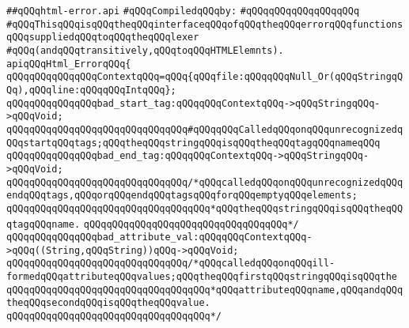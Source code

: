 \label{src/lib/html/html-error.api}
\verb|##qQQqhtml-error.api|\newline
\newline
\verb|#qQQqCompiledqQQqby:|\newline
\verb|#qQQqqQQqqQQqqQQqqQQq|\newline
\newline
\newline
\newline
\verb|#qQQqThisqQQqisqQQqtheqQQqinterfaceqQQqofqQQqtheqQQqerrorqQQqfunctionsqQQqsuppliedqQQqtoqQQqtheqQQqlexer|\newline
\verb|#qQQq(andqQQqtransitively,qQQqtoqQQqHTMLElemnts).|\newline
\newline
\verb|apiqQQqHtml_ErrorqQQq{|\newline
\newline
\verb|qQQqqQQqqQQqqQQqContextqQQq=qQQq{qQQqfile:qQQqqQQqNull_Or(qQQqStringqQQq),qQQqline:qQQqqQQqIntqQQq};|\newline
\newline
\verb|qQQqqQQqqQQqqQQqbad_start_tag:qQQqqQQqContextqQQq->qQQqStringqQQq->qQQqVoid;|\newline
\verb|qQQqqQQqqQQqqQQqqQQqqQQqqQQqqQQq#qQQqqQQqCalledqQQqonqQQqunrecognizedqQQqstartqQQqtags;qQQqtheqQQqstringqQQqisqQQqtheqQQqtagqQQqnameqQQq|\newline
\verb|qQQqqQQqqQQqqQQqbad_end_tag:qQQqqQQqContextqQQq->qQQqStringqQQq->qQQqVoid;|\newline
\verb|qQQqqQQqqQQqqQQqqQQqqQQqqQQqqQQq/*qQQqcalledqQQqonqQQqunrecognizedqQQqendqQQqtags,qQQqorqQQqendqQQqtagsqQQqforqQQqemptyqQQqelements;|\newline
\verb|qQQqqQQqqQQqqQQqqQQqqQQqqQQqqQQqqQQq*qQQqtheqQQqstringqQQqisqQQqtheqQQqtagqQQqname.|\newline
\verb|qQQqqQQqqQQqqQQqqQQqqQQqqQQqqQQqqQQq*/|\newline
\verb|qQQqqQQqqQQqqQQqbad_attribute_val:qQQqqQQqContextqQQq->qQQq((String,qQQqString))qQQq->qQQqVoid;|\newline
\verb|qQQqqQQqqQQqqQQqqQQqqQQqqQQqqQQq/*qQQqcalledqQQqonqQQqill-formedqQQqattributeqQQqvalues;qQQqtheqQQqfirstqQQqstringqQQqisqQQqthe|\newline
\verb|qQQqqQQqqQQqqQQqqQQqqQQqqQQqqQQqqQQq*qQQqattributeqQQqname,qQQqandqQQqtheqQQqsecondqQQqisqQQqtheqQQqvalue.|\newline
\verb|qQQqqQQqqQQqqQQqqQQqqQQqqQQqqQQqqQQq*/|\newline
